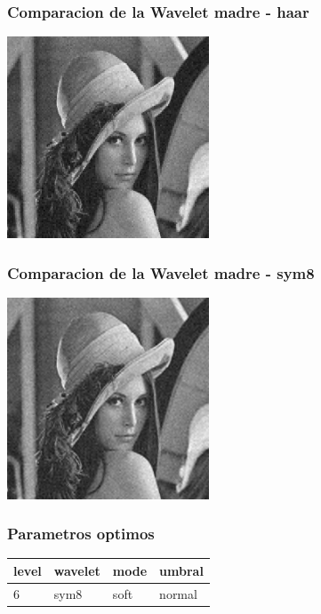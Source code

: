 \documentclass{beamer}
\begin{document}
  \begin{frame}
    \frametitle{Comparacion de la Wavelet madre - haar}
    
    \centering
    
    \includegraphics[width=6cm]{imgs/Wavelets/2_normal_soft_haar_Lenna.jpg}
    

  
  \end{frame}

  \begin{frame}
    \frametitle{Comparacion de la Wavelet madre - sym8}
    
    \centering
    
    
    \includegraphics[width=6cm]{imgs/Wavelets/2_normal_soft_sym8_Lenna.jpg}

  
  \end{frame}

  \begin{frame}
    \frametitle{Parametros optimos}
    \centering
    \begin{tabular}{llll}
      \toprule
      level & wavelet & mode & umbral \\
      \midrule 
      6 & sym8 & soft & normal \\
      \bottomrule
    \end{tabular}
  
  \end{frame}
\end{document}
